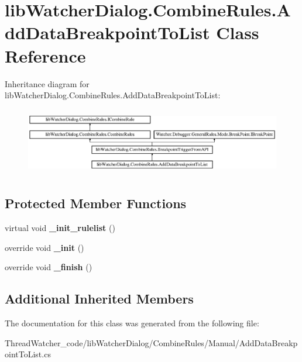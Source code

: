 \hypertarget{classlib_watcher_dialog_1_1_combine_rules_1_1_add_data_breakpoint_to_list}{\section{lib\+Watcher\+Dialog.\+Combine\+Rules.\+Add\+Data\+Breakpoint\+To\+List Class Reference}
\label{classlib_watcher_dialog_1_1_combine_rules_1_1_add_data_breakpoint_to_list}
}
Inheritance diagram for lib\+Watcher\+Dialog.\+Combine\+Rules.\+Add\+Data\+Breakpoint\+To\+List\+:\begin{figure}[H]
\begin{center}
\leavevmode
\includegraphics[height=2.978724cm]{classlib_watcher_dialog_1_1_combine_rules_1_1_add_data_breakpoint_to_list}
\end{center}
\end{figure}
\subsection*{Protected Member Functions}
\begin{DoxyCompactItemize}
\item 
\hypertarget{classlib_watcher_dialog_1_1_combine_rules_1_1_add_data_breakpoint_to_list_a1545e0685aa48dd56eea4a6749618f59}{virtual void {\bfseries \+\_\+init\+\_\+rulelist} ()}\label{classlib_watcher_dialog_1_1_combine_rules_1_1_add_data_breakpoint_to_list_a1545e0685aa48dd56eea4a6749618f59}

\item 
\hypertarget{classlib_watcher_dialog_1_1_combine_rules_1_1_add_data_breakpoint_to_list_abaf67026c519763252b009ee6daa8e9a}{override void {\bfseries \+\_\+init} ()}\label{classlib_watcher_dialog_1_1_combine_rules_1_1_add_data_breakpoint_to_list_abaf67026c519763252b009ee6daa8e9a}

\item 
\hypertarget{classlib_watcher_dialog_1_1_combine_rules_1_1_add_data_breakpoint_to_list_afe0ddb627ddf6d302273df7f30a73ffd}{override void {\bfseries \+\_\+finish} ()}\label{classlib_watcher_dialog_1_1_combine_rules_1_1_add_data_breakpoint_to_list_afe0ddb627ddf6d302273df7f30a73ffd}

\end{DoxyCompactItemize}
\subsection*{Additional Inherited Members}


The documentation for this class was generated from the following file\+:\begin{DoxyCompactItemize}
\item 
Thread\+Watcher\+\_\+code/lib\+Watcher\+Dialog/\+Combine\+Rules/\+Manual/Add\+Data\+Breakpoint\+To\+List.\+cs\end{DoxyCompactItemize}
